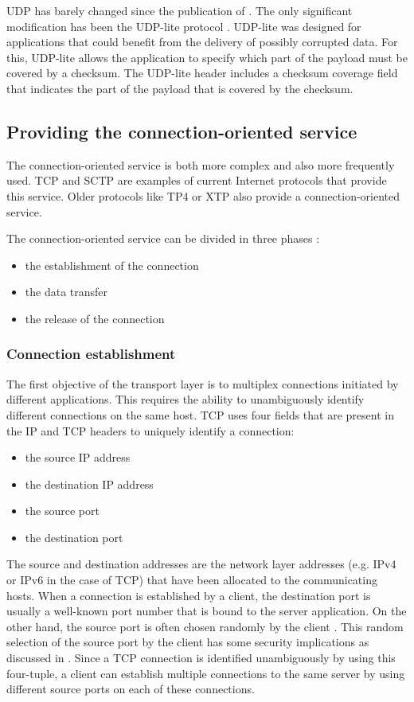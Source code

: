 UDP has barely changed since the publication of \cite{rfc791}. The only significant modification has been the UDP-lite protocol \cite{rfc3828}. UDP-lite was designed for applications that could benefit from the delivery of possibly corrupted data. For this, UDP-lite allows the application to specify which part of the payload must be covered by a checksum. The UDP-lite header includes a checksum coverage field that indicates the part of the payload that is covered by the checksum. 


\subsection{Providing the connection-oriented service}

The connection-oriented service is both more complex and also more frequently used. TCP and SCTP are examples of current Internet protocols that provide this service. Older protocols like TP4 or XTP \cite{strayer1992xtp} also provide a connection-oriented service.

The connection-oriented service can be divided in three phases :
\begin{itemize}
\item the establishment of the connection
\item the data transfer
\item the release of the connection
\end{itemize}

\subsubsection{Connection establishment}

The first objective of the transport layer is to multiplex connections
initiated by different applications. This requires the ability to
unambiguously identify different connections on the same host. TCP
uses four fields that are present in the IP and TCP headers to uniquely
identify a connection:
\begin{itemize}
\item the source IP address
\item the destination IP address
\item the source port
\item the destination port
\end{itemize} 

The source and destination addresses are the network layer addresses (e.g. IPv4 or IPv6 in the case of TCP) that have been allocated to the communicating hosts. When a connection is established by a client, the destination port is usually a well-known port number that is bound to the server application. On the other hand, the source port is often chosen randomly by the client \cite{rfc6056}. This random selection of the source port by the client has some security implications as discussed in \cite{Allman:2009:CSE:1517480.1517483}. Since a TCP connection is identified unambiguously by using this four-tuple, a client can establish multiple connections to the same server by using different source ports on each of these connections.

